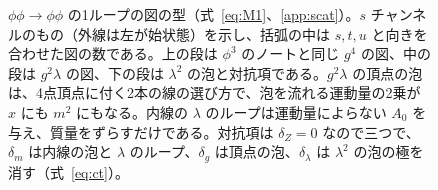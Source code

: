 \documentclass[a4paper,10pt]{ltjsarticle}
\begin{document}
\begin{figure}[tbp]
\caption{$\phi\phi\to\phi\phi$ の1ループの図の型（式~\eqref{eq:M1}、\ref{app:scat}）。$s$ チャンネルのもの（外線は左が始状態）を示し、括弧の中は $s,t,u$ と向きを合わせた図の数である。上の段は $\phi^3$ のノートと同じ $g^4$ の図、中の段は $g^2\lambda$ の図、下の段は $\lambda^2$ の泡と対抗項である。$g^2\lambda$ の頂点の泡は、4点頂点に付く2本の線の選び方で、泡を流れる運動量の2乗が $x$ にも $m^2$ にもなる。内線の $\lambda$ のループは運動量によらない $A_0$ を与え、質量をずらすだけである。対抗項は $\delta_Z=0$ なので三つで、$\delta_m$ は内線の泡と $\lambda$ のループ、$\delta_g$ は頂点の泡、$\delta_\lambda$ は $\lambda^2$ の泡の極を消す（式~\eqref{eq:ct}）。}
\label{fig:scatloop}
\end{figure}
\end{document}
